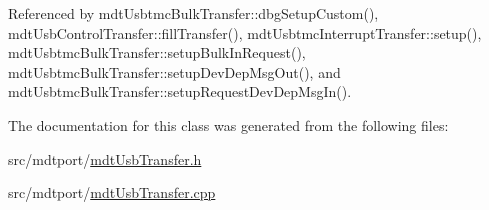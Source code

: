 Referenced by mdt\-Usbtmc\-Bulk\-Transfer\-::dbg\-Setup\-Custom(), mdt\-Usb\-Control\-Transfer\-::fill\-Transfer(), mdt\-Usbtmc\-Interrupt\-Transfer\-::setup(), mdt\-Usbtmc\-Bulk\-Transfer\-::setup\-Bulk\-In\-Request(), mdt\-Usbtmc\-Bulk\-Transfer\-::setup\-Dev\-Dep\-Msg\-Out(), and mdt\-Usbtmc\-Bulk\-Transfer\-::setup\-Request\-Dev\-Dep\-Msg\-In().



The documentation for this class was generated from the following files\-:\begin{DoxyCompactItemize}
\item 
src/mdtport/\hyperlink{mdt_usb_transfer_8h}{mdt\-Usb\-Transfer.\-h}\item 
src/mdtport/\hyperlink{mdt_usb_transfer_8cpp}{mdt\-Usb\-Transfer.\-cpp}\end{DoxyCompactItemize}
